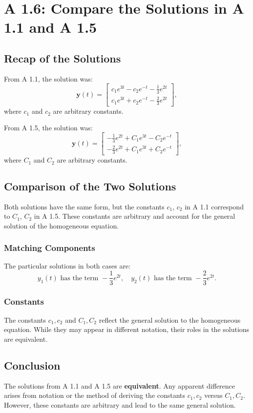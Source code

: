 \documentclass[12pt]{article}
\begin{document}
\section*{A 1.6: Compare the Solutions in A 1.1 and A 1.5}

\subsection*{Recap of the Solutions}
From A 1.1, the solution was:
\[
\mathbf{y}(t) = \begin{bmatrix} c_1e^{3t} - c_2e^{-t} - \frac{1}{3}e^{2t} \\ c_1e^{3t} + c_2e^{-t} - \frac{2}{3}e^{2t} \end{bmatrix},
\]
where \(c_1\) and \(c_2\) are arbitrary constants.

From A 1.5, the solution was:
\[
\mathbf{y}(t) = \begin{bmatrix} -\frac{1}{3}e^{2t} + C_1e^{3t} - C_2e^{-t} \\ -\frac{2}{3}e^{2t} + C_1e^{3t} + C_2e^{-t} \end{bmatrix},
\]
where \(C_1\) and \(C_2\) are arbitrary constants.

\subsection*{Comparison of the Two Solutions}
Both solutions have the same form, but the constants \(c_1\), \(c_2\) in A 1.1 correspond to \(C_1\), \(C_2\) in A 1.5. These constants are arbitrary and account for the general solution of the homogeneous equation.

\subsubsection*{Matching Components}
The particular solutions in both cases are:
\[
y_1(t) \text{ has the term } -\frac{1}{3}e^{2t}, \quad y_2(t) \text{ has the term } -\frac{2}{3}e^{2t}.
\]

\subsubsection*{Constants}
The constants \(c_1, c_2\) and \(C_1, C_2\) reflect the general solution to the homogeneous equation. While they may appear in different notation, their roles in the solutions are equivalent.

\subsection*{Conclusion}
The solutions from A 1.1 and A 1.5 are \textbf{equivalent}. Any apparent difference arises from notation or the method of deriving the constants \(c_1, c_2\) versus \(C_1, C_2\). However, these constants are arbitrary and lead to the same general solution.
\end{document}

